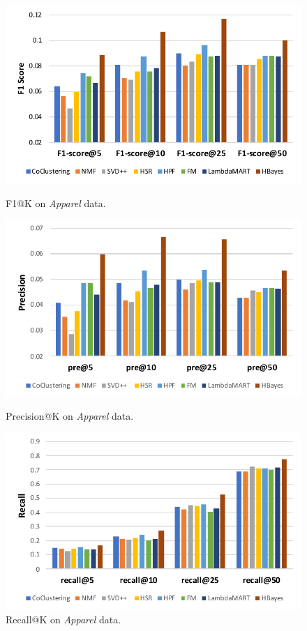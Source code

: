 \begin{figure}[!htb]
  \includegraphics[width=\linewidth]{fig/F1-score_jd}
  \caption{F1@K on \emph{Apparel} data.}\label{fig:awesome_image1}
\endminipage\hfill
{}
  \includegraphics[width=\linewidth]{fig/precision_jd}
  \caption{Precision@K on \emph{Apparel} data.}\label{fig:awesome_image2}
\endminipage\hfill
{}%
  \includegraphics[width=\linewidth]{fig/recall_jd}
  \caption{Recall@K on \emph{Apparel} data.}\label{fig:awesome_image3}
\endminipage
\end{figure}


